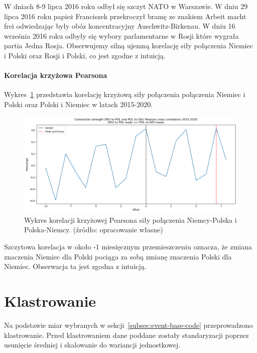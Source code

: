 \documentclass[11pt]{report}
\begin{document}
    W dniach 8-9 lipca 2016 roku odbył się szczyt NATO w Warszawie.
    W dniu 29 lipca 2016 roku papież Franciszek przekroczył bramę ze znakiem Arbeit macht frei odwiedzając
    były obóz koncentracyjny Auschwitz-Birkenau.
    W dniu 16 września 2016 roku odbyły się wybory parlamentarne w Rosji które wygrała partia Jedna Rosja.
    Obserwujemy silną ujemną korelację siły połączenia Niemiec i Polski oraz Rosji i Polski,
    co jest zgodne z intuicją.

    \paragraph{Korelacja krzyżowa Pearsona}
    Wykres~\ref{fig:Connection strength DEU to POL and POL to DEU Pearson cross correlation 2015-2020} przedstawia korelację krzyżową siły połączenia połączenia Niemiec i Polski oraz Polski i Niemiec w latach 2015-2020.

    \begin{figure}[!ht]
        \centering
        \includegraphics[width=\linewidth]{../spade_proto/figures/auto_seek/connection strength/cross_correlation/Connection strength DEU to POL and POL to DEU Pearson cross correlation 2015-2020.png}
        \caption{Wykres korelacji krzyżowej Pearsona siły połączenia
        Niemcy-Polska i Polska-Niemcy. (źródło: opracowanie własne)}
        \label{fig:Connection strength DEU to POL and POL to DEU Pearson cross correlation 2015-2020}
    \end{figure}

    Szczytowa korelacja w około -1 miesięcznym przemieszczeniu oznacza, że zmiana znaczenia Niemiec dla Polski pociąga za sobą zmianę znaczenia Polski dla Niemiec.
    Obserwacja ta jest zgodna z intuicją.


    \section{Klastrowanie}
    Na podstawie miar wybranych w sekcji~\ref{subsec:event-base-code} przeprowadzono klastrowanie.
    Przed klastrowaniem dane poddane zostały standaryzacji poprzez usunięcie średniej i skalowanie do wariancji jednostkowej.
\end{document}

